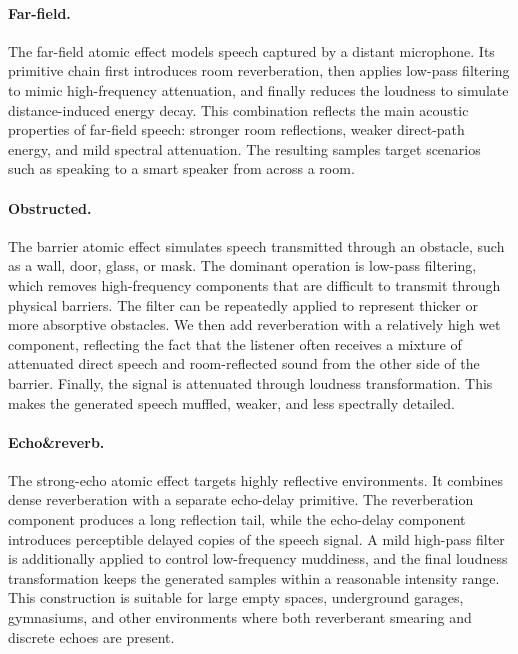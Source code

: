 \documentclass{article}
\begin{document}
\paragraph{Far-field.}
The far-field atomic effect models speech captured by a distant microphone.
Its primitive chain first introduces room reverberation, then applies low-pass
filtering to mimic high-frequency attenuation, and finally reduces the loudness
to simulate distance-induced energy decay. This combination reflects the main
acoustic properties of far-field speech: stronger room reflections, weaker
direct-path energy, and mild spectral attenuation. The resulting samples target
scenarios such as speaking to a smart speaker from across a room.

\paragraph{Obstructed.}
The barrier atomic effect simulates speech transmitted through an obstacle,
such as a wall, door, glass, or mask. The dominant operation is low-pass
filtering, which removes high-frequency components that are difficult to
transmit through physical barriers. The filter can be repeatedly applied to
represent thicker or more absorptive obstacles. We then add reverberation with
a relatively high wet component, reflecting the fact that the listener often
receives a mixture of attenuated direct speech and room-reflected sound from
the other side of the barrier. Finally, the signal is attenuated through
loudness transformation. This makes the generated speech muffled, weaker, and
less spectrally detailed.

\paragraph{Echo\&reverb.}
The strong-echo atomic effect targets highly reflective environments. It
combines dense reverberation with a separate echo-delay primitive. The
reverberation component produces a long reflection tail, while the echo-delay
component introduces perceptible delayed copies of the speech signal. A mild
high-pass filter is additionally applied to control low-frequency muddiness,
and the final loudness transformation keeps the generated samples within a
reasonable intensity range. This construction is suitable for large empty
spaces, underground garages, gymnasiums, and other environments where both
reverberant smearing and discrete echoes are present.
\end{document}
